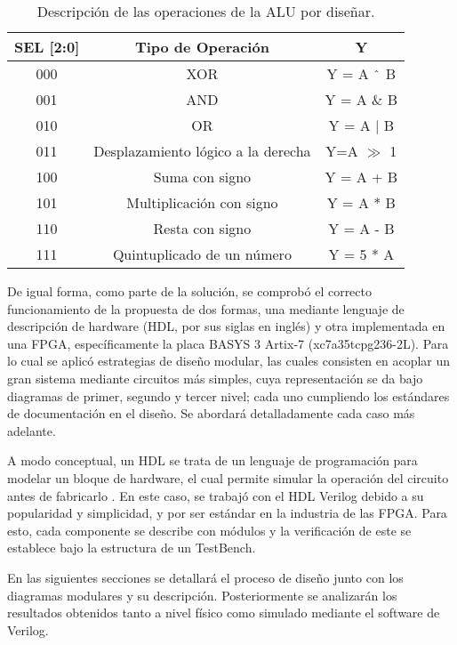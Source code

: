 \documentclass[journal,trans]{IEEEtran}
\begin{document}
\begin{table}[!h]
  \begin{center}
    \caption{Descripción de las operaciones de la ALU por diseñar.}
    \label{tab:operaciones}
    \begin{tabular}{c | c | c }
      \hline
      SEL [2:0] & Tipo de Operación & Y \\
      \hline
       000 & XOR & Y = A $\string^$ B \\
       \hline
       001 & AND & Y = A $\&$ B \\
       \hline
       010 & OR & Y = A $\mid$ B \\
       \hline
       011 & Desplazamiento lógico a la derecha & Y=A $\gg$ 1 \\
       \hline
       100 & Suma con signo & Y = A + B \\
       \hline
       101 & Multiplicación con signo & Y = A * B \\
       \hline
       110 & Resta con signo & Y = A - B \\
       \hline
       111 & Quintuplicado de un número & Y = 5 * A \\
      \hline
    \end{tabular}
  \end{center}
\end{table}

De igual forma, como parte de la solución, se comprobó el correcto funcionamiento de la propuesta de dos formas, una mediante lenguaje de descripción de hardware (HDL, por sus siglas en inglés) y otra implementada en una FPGA, específicamente la placa BASYS 3 Artix-7 (xc7a35tcpg236-2L). Para lo cual se aplicó estrategias de diseño modular, las cuales consisten en acoplar un gran sistema mediante circuitos más simples, cuya representación se da bajo diagramas de primer, segundo y tercer nivel; cada uno cumpliendo los estándares de documentación en el diseño. Se abordará detalladamente cada caso más adelante.

A modo conceptual, un HDL se trata de un lenguaje de programación para modelar un bloque de hardware, el cual permite simular la operación del circuito antes de fabricarlo \cite{Paulino}. En este caso, se trabajó con el HDL Verilog debido a su popularidad y simplicidad, y por ser estándar en la industria de las FPGA. Para esto, cada componente se describe con módulos y la verificación de este se establece bajo la estructura de un TestBench.

En las siguientes secciones se detallará el proceso de diseño junto con los diagramas modulares y su descripción. Posteriormente se analizarán los resultados obtenidos tanto a nivel físico como simulado mediante el software de Verilog. 
\end{document}
